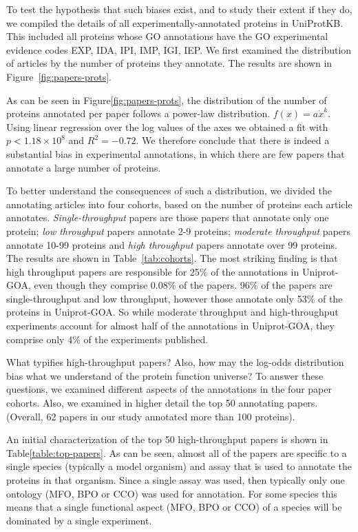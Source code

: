\documentclass[12pt]{article}
\begin{document}
To test the hypothesis that such biases exist, and to study their extent if they
do, we compiled the details of all experimentally-annotated
proteins in UniProtKB. This included all proteins whose GO annotations have
the GO experimental evidence codes EXP, IDA, IPI, IMP, IGI, IEP. We first examined
the distribution of articles by the number of proteins they annotate. The results
are shown in Figure~\ref{fig:papers-prots}. 

As can be seen in Figure\ref{fig:papers-prots}, the distribution of the number of proteins
annotated per paper follows a power-law distribution. $f(x)=a\dot x^k$.  Using linear regression
over the log values of the axes we obtained a fit with $p<1.18\times 10^8$ and $R^2=-0.72$.  We
therefore conclude that there is indeed a substantial bias in experimental annotations, in which
there are few papers that annotate a large number of proteins.

To better understand the consequences of such a distribution, we divided the annotating articles
into four cohorts, based on the number of proteins each article annotates.
\textit{Single-throughput} papers are those papers that annotate only one protein; \textit{low
throughput} papers annotate 2-9 proteins; \textit{moderate throughput} papers annotate 10-99
proteins and \textit{high throughput} papers annotate over 99 proteins. The results are shown in
Table~\ref{tab:cohorts}. The most striking finding is that high throughput papers are responsible
for 25\% of the annotations in Uniprot-GOA, even though they comprise 0.08\% of the papers. 96\%
of the papers are single-throughput and low throughput, however those annotate only 53\% of the
proteins in Uniprot-GOA. So while moderate throughput and high-throughput experiments account for
almost half of the annotations in Uniprot-GOA, they comprise only 4\% of the experiments
published.

What typifies high-throughput papers? Also, how may the log-odds distribution bias what we
understand of the protein function universe? To answer these questions, we examined
different aspects of the annotations in the four paper cohorts. Also, we examined in higher
detail the top 50 annotating papers. (Overall, 62 papers in our study annotated more than
100 proteins). 

An initial characterization of the top 50 high-throughput papers is shown in
Table\ref{table:top-papers}.  As can be seen, almost all of the papers are specific to a
single species (typically a model organism) and assay that is used to annotate the proteins
in that organism.  Since a single assay was used, then typically only one ontology (MFO, BPO
or CCO) was used for annotation. For some species this means that a single functional aspect
(MFO, BPO or CCO) of a species will be dominated by a single experiment.
\end{document}
